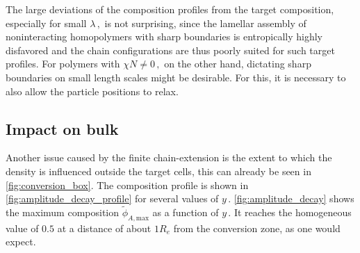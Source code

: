\documentclass[bachelor,       %
               oneside,        %
               BCOR10mm,       %
               ngerman, english %
               ]{GAUBM}
\begin{document}
The large deviations of the composition profiles from the target composition, especially for small $\lambda\,,$ is not surprising, since the lamellar assembly of noninteracting homopolymers with sharp boundaries is entropically highly disfavored and the chain configurations are thus poorly suited for such target profiles. For polymers with $\chi N\neq 0\,,$ on the other hand, dictating sharp boundaries on small length scales might be desirable. For this, it is necessary to also allow the particle positions to relax.

\subsection{Impact on bulk}

Another issue caused by the finite chain-extension is the extent to which the density is influenced outside the target cells, this can already be seen in \autoref{fig:conversion_box}. The composition profile is shown in \autoref{fig:amplitude_decay_profile} for several values of $y\,.$ \autoref{fig:amplitude_decay} shows the maximum composition $\tilde\phi_{A,\mathrm{max}}$ as a function of $y\,.$ It reaches the homogeneous value of $0.5$ at a distance of about $1R_e$ from the conversion zone, as one would expect. 
\end{document}
